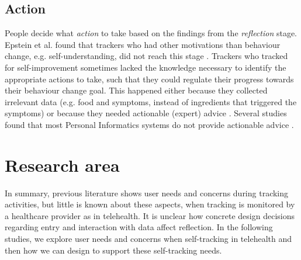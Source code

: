 \subsection{Action} 
People decide what \textit{action} to take based on the findings from the \textit{reflection} stage. Epstein et al. found that trackers who had other motivations than behaviour change, e.g. self-understanding, did not reach this stage \cite{Epstein2015}. Trackers who tracked for self-improvement sometimes lacked the knowledge necessary to identify the appropriate actions to take, such that they could regulate their progress towards their behaviour change goal. This happened either because they collected irrelevant data \cite{Choe2014, Chung2015} (e.g. food and symptoms, instead of ingredients that triggered the symptoms) or because they needed actionable (expert) advice \cite{Verdezoto2015, Li2010, Oh2015}. Several studies found that most Personal Informatics systems do not provide actionable advice \cite{Chung2015, Li2010, Verdezoto2015}.

\section{Research area}
In summary, previous literature shows user needs and concerns during tracking activities, but little is known about these aspects, when tracking is monitored by a healthcare provider as in telehealth. It is unclear how concrete design decisions regarding entry and interaction with data affect reflection. In the following studies, we explore user needs and concerns when self-tracking in telehealth and then how we can design to support these self-tracking needs. 
